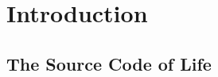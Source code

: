 \chapter{Introduction}
\label{introduction}
\setcounter{figure}{-1}
\setcounter{table}{-1}
\setcounter{section}{-1}
\setcounter{NAT@ctr}{-1}

\setlength\parindent{0pt}

\section{The Source Code of Life}

